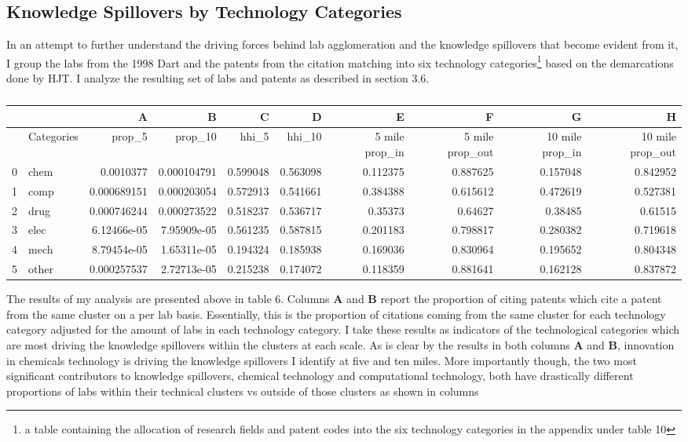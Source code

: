 \documentclass[12pt,letterpaper]{article}
\begin{document}
\subsection{Knowledge Spillovers by Technology Categories}
In an attempt to further understand the driving forces behind lab agglomeration and the knowledge spillovers that become evident from it, I group the labs from the 1998 Dart and the patents from the citation matching into six technology categories\footnote{a table containing the allocation of research fields and patent codes into the six technology categories in the appendix under table 10} based on the demarcations done by HJT. I analyze the resulting set of labs and patents as described in section 3.6.
\begin{table}[H]
\tiny
\centering
\begin{tabular}{rlrrrrrrrr}
\multicolumn{1}{l}{} &       & A           & B           & C        & D        & E        & F        & G        & H        \\ \hline
 & Categories & prop\_5 & prop\_10 & hhi\_5 & hhi\_10 & 5 mile prop\_in & 5 mile prop\_out & 10 mile prop\_in & 10 mile prop\_out \\ \hline
0                    & chem  & 0.0010377   & 0.000104791 & 0.599048 & 0.563098 & 0.112375 & 0.887625 & 0.157048 & 0.842952 \\
1                    & comp  & 0.000689151 & 0.000203054 & 0.572913 & 0.541661 & 0.384388 & 0.615612 & 0.472619 & 0.527381 \\
2                    & drug  & 0.000746244 & 0.000273522 & 0.518237 & 0.536717 & 0.35373  & 0.64627  & 0.38485  & 0.61515  \\
3                    & elec  & 6.12466e-05 & 7.95909e-05 & 0.561235 & 0.587815 & 0.201183 & 0.798817 & 0.280382 & 0.719618 \\
4                    & mech  & 8.79454e-05 & 1.65311e-05 & 0.194324 & 0.185938 & 0.169036 & 0.830964 & 0.195652 & 0.804348 \\
5                    & other & 0.000257537 & 2.72713e-05 & 0.215238 & 0.174072 & 0.118359 & 0.881641 & 0.162128 & 0.837872 \\ \hline
\end{tabular}
\caption{}
\label{tab:6}
\end{table}
The results of my analysis are presented above in table 6. Columns \textbf{A} and \textbf{B} report the proportion of citing patents which cite a patent from the same cluster on a per lab basis. Essentially, this is the proportion of citations coming from the same cluster for each technology category adjusted for the amount of labs in each technology category. I take these results as indicators of the technological categories which are most driving the knowledge spillovers within the clusters at each scale. As is clear by the results in both columns \textbf{A} and \textbf{B}, innovation in chemicals technology is driving the knowledge spillovers I identify at five and ten miles. More importantly though, the two most significant contributors to knowledge spillovers, chemical technology and computational technology, both have drastically different proportions of labs within their technical clusters vs outside of those clusters as shown in columns
\end{document}
